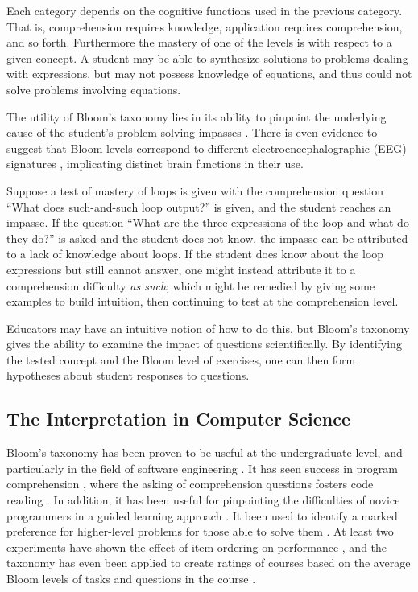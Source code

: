 Each category depends on the cognitive functions used in the previous category.
That is, comprehension requires knowledge, application requires comprehension,
and so forth.  Furthermore the mastery of one of the levels is with respect to
a given concept.  A student may be able to synthesize solutions to problems
dealing with expressions, but may not possess knowledge of equations, and thus
could not solve problems involving equations.

The utility of Bloom's taxonomy lies in its ability to pinpoint the underlying
cause of the student's problem-solving impasses \cite{shuhidan2011}.  
There is even evidence to suggest that Bloom levels correspond to different
electroencephalographic (EEG) signatures \cite{chatterjee2015}, implicating
distinct brain functions in their use. 

Suppose a test of mastery of loops is given with the comprehension question
``What does such-and-such loop output?'' is given, and the student reaches an
impasse.  If the question ``What are the three expressions of the loop and what
do they do?'' is asked and the student does not know, the impasse can be
attributed to a lack of knowledge about loops.  If the student does know about
the loop expressions but still cannot answer, one might instead attribute it to
a comprehension difficulty \emph{as such}; which might be remedied by giving
some examples to build intuition, then continuing to test at the comprehension
level.

Educators may have an intuitive notion of how to do this, but Bloom's taxonomy
gives the ability to examine the impact of questions scientifically.  By
identifying the tested concept and the Bloom level of exercises, one can then
form hypotheses about student responses to questions.  

\subsection{The Interpretation in Computer Science}

Bloom's taxonomy has been proven to be useful at the undergraduate level, and
particularly in the field of software engineering \cite{britto2015,
mahmood2014}.  It has seen success in program comprehension
\cite{buckley2003}, where the asking of comprehension questions fosters code
reading \cite{losada2008}. In addition, it has been useful for pinpointing the
difficulties of novice programmers in a guided learning approach
\cite{shuhidan2011}.  It been used to identify a marked preference for
higher-level problems for those able to solve them \cite{bruyn2011}
\cite{goel2004}.  At least two experiments have shown the effect of item
ordering on performance \cite{newman1988effect,castleberry2016effect}, and the
taxonomy has even been applied to create ratings of courses based on the
average Bloom levels of tasks and questions in the course
\cite{oliver2004course}.

